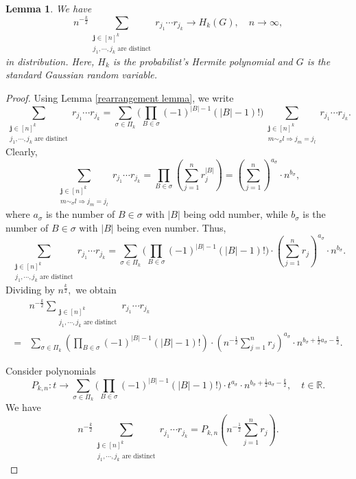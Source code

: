 \documentclass{amsart}
\numberwithin{equation}{section}
\newtheorem{lem}[thm]{Lemma}
\theoremstyle{definition}
\theoremstyle{remark}
\newcommand{\1}{\mathbf 1}
\begin{document}
\begin{lem}\label{convergence in distribution lemma} We have
$$n^{-\frac{k}{2}}\sum_{\substack{\mathbf{j}\in [n]^k\\ j_1,\cdots,j_k\mbox{ are distinct}}}r_{j_1}\cdots r_{j_k}\to H_k(G),\quad n\to\infty,$$
in distribution. Here, $H_k$ is the probabilist's Hermite polynomial and $G$ is the standard Gaussian random variable.
\end{lem}
\begin{proof} Using Lemma \ref{rearrangement lemma}, we write
$$\sum_{\substack{\mathbf{j}\in [n]^k\\
j_1,\cdots,j_k\mbox{ are distinct}}}r_{j_1}\cdots r_{j_k}=\sum_{\sigma\in\Pi_k}
\Big(\prod_{B\in\sigma}
(-1)^{|B|-1}(|B|-1)!\Big)\sum_{\substack{\mathbf{j}\in [n]^k\\m\sim_\sigma l\Rightarrow j_m=j_l}}
r_{j_1}\cdots r_{j_k}.$$
Clearly,
$$\sum_{\substack{\mathbf{j}\in [n]^k\\m\sim_\sigma l\Rightarrow j_m=j_l}}
r_{j_1}\cdots r_{j_k}=\prod_{B\in\sigma}(\sum_{j=1}^nr_j^{|B|})=(\sum_{j=1}^n)^{a_{\sigma}}\cdot n^{b_{\sigma}},$$
where $a_{\sigma}$ is the number of $B\in\sigma$ with $|B|$ being odd number, while $b_{\sigma}$ is the number of $B\in\sigma$ with $|B|$ being even number.
Thus,
$$\sum_{\substack{\mathbf{j}\in [n]^k\\
j_1,\cdots,j_k\mbox{ are distinct}}}r_{j_1}\cdots r_{j_k}=\sum_{\sigma\in\Pi_k}
\Big(\prod_{B\in\sigma}
(-1)^{|B|-1}(|B|-1)!\Big)\cdot (\sum_{j=1}^nr_j)^{a_{\sigma}}\cdot n^{b_{\sigma}}.$$
Dividing by $n^{\frac{k}{2}},$ we obtain
\begin{align*}
&n^{-\frac{k}{2}}\sum_{\substack{\mathbf{j}\in [n]^k\\
j_1,\cdots,j_k\mbox{ are distinct}}}r_{j_1}\cdots r_{j_k}\\
=&\sum_{\sigma\in\Pi_k}\left(\prod_{B\in\sigma}
(-1)^{|B|-1}(|B|-1)!\right)\cdot \left(n^{-\frac12}\sum_{j=1}^nr_j\right)^{a_{\sigma}}\cdot n^{b_{\sigma}+\frac12a_{\sigma}-\frac{k}{2}}.
\end{align*}

Consider polynomials
$$P_{k,n}:t\to \sum_{\sigma\in\Pi_k}
\Big(\prod_{B\in\sigma}
(-1)^{|B|-1}(|B|-1)!\Big)\cdot t^{a_{\sigma}}\cdot n^{b_{\sigma}+\frac12a_{\sigma}-\frac{k}{2}},\quad t\in\mathbb{R}.$$
We have
$$n^{-\frac{k}{2}}\sum_{\substack{\mathbf{j}\in [n]^k\\
j_1,\cdots,j_k\mbox{ are distinct}}}r_{j_1}\cdots r_{j_k}=P_{k,n}(n^{-\frac12}\sum_{j=1}^nr_j).$$


\end{proof}
\end{document}

